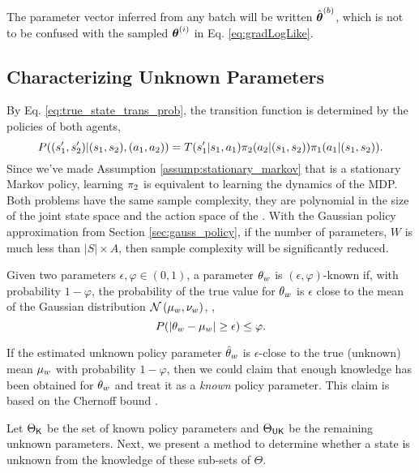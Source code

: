 \begin{remark}
        The parameter vector inferred from any batch will be written $\hat{\boldsymbol{\mathbb{\theta}}}^{(b)}$, which is not
        to be confused with the sampled $\boldsymbol{\mathbb{\theta}}^{(i)}$ in Eq. \ref{eq:gradLogLike}.
\end{remark}

\subsection{Characterizing Unknown Parameters}\label{sec:unknown_params}
    By Eq. \ref{eq:true_state_trans_prob}, the transition function is determined by the policies of both agents,
    \[
    P((s_1',s_2')|(s_1,s_2),(a_1,a_2)) = T(s_1'|s_1,a_1) \pi_{2}(a_2|(s_1,s_2))\pi_{1}(a_1|(s_1,s_2)).
    \]
    Since we've made Assumption \ref{assump:stationary_markov} that  is a stationary Markov policy, learning
    $\pi_{2}$ is equivalent to learning the dynamics of the MDP. Both problems have the same sample complexity, they
    are polynomial in the size of the joint state space and the action space of the . With the Gaussian policy
    approximation from Section \ref{sec:gauss_policy}, if the number of parameters, $W$ is much less than $|S|\times A$,
    then sample complexity will be significantly reduced.

    \begin{definition}
        Given two parameters $\epsilon, \varphi \in (0,1)$, a parameter $\theta_{w}$ is $(\epsilon,
        \varphi)$-known if, with probability $1-\varphi$, the probability of the true value for $\theta_{w}$ is
        $\epsilon$ close to the mean of the Gaussian distribution $\mathcal{N}\left(\mu_{w}, \nu_{w}\right)$, \ie,
        \[
            P(\lvert\theta_{w} - \mu_{w}\rvert \ge \epsilon) \le \varphi.
        \]
    \end{definition}

    If the estimated unknown policy parameter $\hat{\theta}_w$ is $\epsilon$-close to the true (unknown) mean
    $\mu_{w}$ with probability $1-\varphi$, then we could claim  that enough knowledge has been obtained for
    $\theta_{w}$ and treat it as a \emph{known} policy parameter. This claim is based on the Chernoff bound
    \cite{kobayashi2011probability}.

    Let $\Theta_{\mathsf{K}}$ be the set of known policy parameters and $\Theta_{\mathsf{UK}}$ be the remaining unknown
    parameters.  Next, we present a method to determine whether a state is unknown from the knowledge of these sub-sets
    of $\Theta$.

